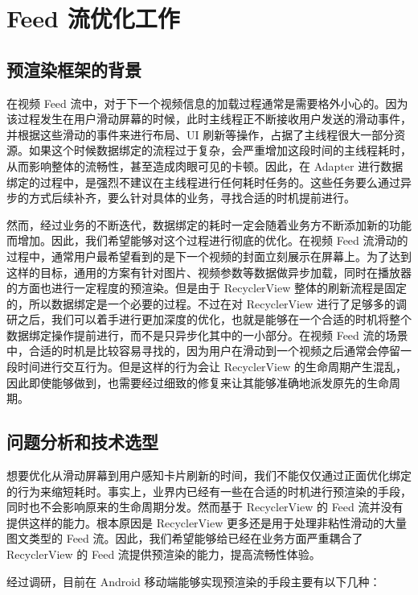 \chapter{Feed 流优化工作}

\section{预渲染框架的背景}

在视频 Feed 流中，对于下一个视频信息的加载过程通常是需要格外小心的。因为该过程发生在用户滑动屏幕的时候，此时主线程正不断接收用户发送的滑动事件，并根据这些滑动的事件来进行布局、UI 刷新等操作，占据了主线程很大一部分资源。如果这个时候数据绑定的流程过于复杂，会严重增加这段时间的主线程耗时，从而影响整体的流畅性，甚至造成肉眼可见的卡顿。因此，在 Adapter 进行数据绑定的过程中，是强烈不建议在主线程进行任何耗时任务的。这些任务要么通过异步的方式后续补齐，要么针对具体的业务，寻找合适的时机提前进行。

然而，经过业务的不断迭代，数据绑定的耗时一定会随着业务方不断添加新的功能而增加。因此，我们希望能够对这个过程进行彻底的优化。在视频 Feed 流滑动的过程中，通常用户最希望看到的是下一个视频的封面立刻展示在屏幕上。为了达到这样的目标，通用的方案有针对图片、视频参数等数据做异步加载，同时在播放器的方面也进行一定程度的预渲染。但是由于 RecyclerView 整体的刷新流程是固定的，所以数据绑定是一个必要的过程。不过在对 RecyclerView 进行了足够多的调研之后，我们可以着手进行更加深度的优化，也就是能够在一个合适的时机将整个数据绑定操作提前进行，而不是只异步化其中的一小部分。在视频 Feed 流的场景中，合适的时机是比较容易寻找的，因为用户在滑动到一个视频之后通常会停留一段时间进行交互行为。但是这样的行为会让 RecyclerView 的生命周期产生混乱，因此即使能够做到，也需要经过细致的修复来让其能够准确地派发原先的生命周期。

\section{问题分析和技术选型}

想要优化从滑动屏幕到用户感知卡片刷新的时间，我们不能仅仅通过正面优化绑定的行为来缩短耗时。事实上，业界内已经有一些在合适的时机进行预渲染的手段，同时也不会影响原来的生命周期分发。然而基于 RecyclerView 的 Feed 流并没有提供这样的能力。根本原因是 RecyclerView 更多还是用于处理非粘性滑动的大量图文类型的 Feed 流。因此，我们希望能够给已经在业务方面严重耦合了 RecyclerView 的 Feed 流提供预渲染的能力，提高流畅性体验。

经过调研，目前在 Android 移动端能够实现预渲染的手段主要有以下几种：

